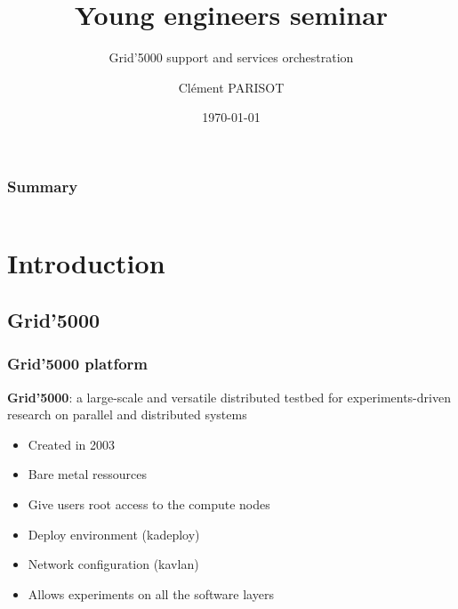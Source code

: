\documentclass[11pt,compress,final]{beamer}
\author{Clément PARISOT}
\title{Young engineers seminar}
\subtitle{Grid'5000 support and services orchestration}
\institute{IJD INRIA Nancy\\MADYNES Team\vspace{2.75cm}}
\begin{document}
\date{\scriptsize \today}

{
\begin{frame}[plain]
  \titlepage
\end{frame}
}
\addtocounter{framenumber}{-1}

\begin{frame}
\frametitle{Summary}
\begin{columns}[t]
  \begin{column}{5cm}
  \tableofcontents[sections={1-3},hideothersubsections]
  \end{column}
  \begin{column}{5cm}
  \tableofcontents[sections={4-6},hideothersubsections]
  \end{column}
  \end{columns}
\end{frame}

\section{Introduction}
\subsection{Grid'5000}
\begin{frame}
\frametitle{Grid'5000 platform}
\begin{block}{}
\textbf{Grid'5000}: a large-scale and versatile distributed testbed for experiments-driven research on parallel and distributed systems
\end{block}
\begin{itemize}
\item Created in 2003
\item Bare metal ressources
\item Give users root access to the compute nodes
\item Deploy environment (kadeploy)
\item Network configuration (kavlan)
\item Allows experiments on all the software layers
\end{itemize}
\end{frame}
\end{document}
